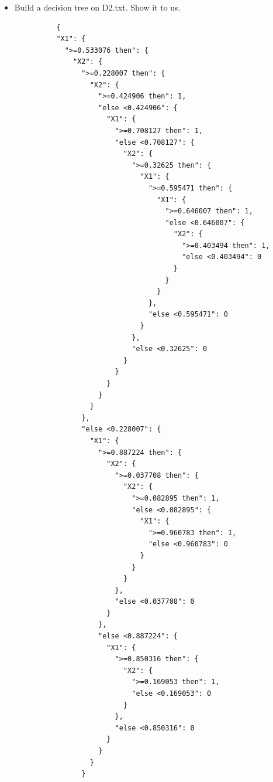 \documentclass[a4paper]{article}
\theoremstyle{definition}
\newenvironment{soln}{
    \leavevmode\color{blue}\ignorespaces
}{}
\begin{document}
\begin{enumerate}
\begin{itemize}
  \item Build a decision tree on D2.txt.  Show it to us.
  \begin{soln}
      \begin{lstlisting}
          {
          "X1": {
            ">=0.533076 then": {
              "X2": {
                ">=0.228007 then": {
                  "X2": {
                    ">=0.424906 then": 1,
                    "else <0.424906": {
                      "X1": {
                        ">=0.708127 then": 1,
                        "else <0.708127": {
                          "X2": {
                            ">=0.32625 then": {
                              "X1": {
                                ">=0.595471 then": {
                                  "X1": {
                                    ">=0.646007 then": 1,
                                    "else <0.646007": {
                                      "X2": {
                                        ">=0.403494 then": 1,
                                        "else <0.403494": 0
                                      }
                                    }
                                  }
                                },
                                "else <0.595471": 0
                              }
                            },
                            "else <0.32625": 0
                          }
                        }
                      }
                    }
                  }
                },
                "else <0.228007": {
                  "X1": {
                    ">=0.887224 then": {
                      "X2": {
                        ">=0.037708 then": {
                          "X2": {
                            ">=0.082895 then": 1,
                            "else <0.082895": {
                              "X1": {
                                ">=0.960783 then": 1,
                                "else <0.960783": 0
                              }
                            }
                          }
                        },
                        "else <0.037708": 0
                      }
                    },
                    "else <0.887224": {
                      "X1": {
                        ">=0.850316 then": {
                          "X2": {
                            ">=0.169053 then": 1,
                            "else <0.169053": 0
                          }
                        },
                        "else <0.850316": 0
                      }
                    }
                  }
                }

\end{lstlisting}
\end{soln}
\end{itemize}
\end{enumerate}
\end{document}
